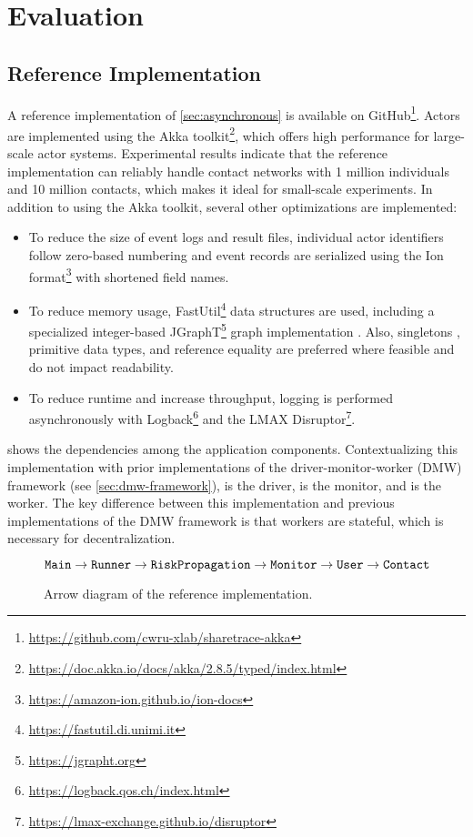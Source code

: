 \chapter{Evaluation}\label{ch:evaluation}

\section{Reference Implementation}

A reference implementation of \cref{sec:asynchronous} is available on GitHub\footnote{\url{https://github.com/cwru-xlab/sharetrace-akka}}. Actors are implemented using the Akka toolkit\footnote{\url{https://doc.akka.io/docs/akka/2.8.5/typed/index.html}}, which offers high performance for large-scale actor systems. Experimental results indicate that the reference implementation can reliably handle contact networks with 1 million individuals and 10 million contacts, which makes it ideal for small-scale experiments. In addition to using the Akka toolkit, several other optimizations are implemented:
\begin{itemize}
  \item To reduce the size of event logs and result files, individual actor identifiers follow zero-based numbering and event records are serialized using the Ion format\footnote{\url{https://amazon-ion.github.io/ion-docs}} with shortened field names.
  \item To reduce memory usage, FastUtil\footnote{\url{https://fastutil.di.unimi.it}} data structures are used, including a specialized integer-based JGraphT\footnote{\url{https://jgrapht.org}} graph implementation \citep{Michail2020}. Also, singletons \citep{Gamma1995}, primitive data types, and reference equality are preferred where feasible and do not impact readability.
  \item To reduce runtime and increase throughput, logging is performed asynchronously with Logback\footnote{\url{https://logback.qos.ch/index.html}} and the LMAX Disruptor\footnote{\url{https://lmax-exchange.github.io/disruptor}}.
\end{itemize}

 shows the dependencies among the application components. Contextualizing this implementation with prior implementations of the driver-monitor-worker (DMW) framework (see \cref{sec:dmw-framework}),  is the driver,  is the monitor, and  is the worker. The key difference between this implementation and previous implementations of the DMW framework is that workers are stateful, which is necessary for decentralization.
\begin{figure}[htbp]
\begin{equation*}
  \texttt{Main} \rightarrow \texttt{Runner} \rightarrow \texttt{RiskPropagation} \rightarrow \texttt{Monitor} \rightarrow \texttt{User} \rightarrow \texttt{Contact}
\end{equation*}
\caption[Arrow diagram of the reference implementation]{Arrow diagram of the reference implementation.}
\label{fig:arrow-diagram}
\end{figure}


